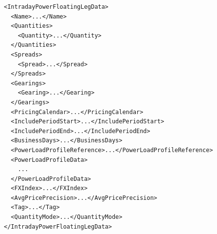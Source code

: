 \begin{listing}[h!]
\begin{verbatim}
<IntradayPowerFloatingLegData>
  <Name>...</Name>
  <Quantities>
    <Quantity>...</Quantity>
  </Quantities>
  <Spreads>
    <Spread>...</Spread>
  </Spreads>
  <Gearings>
    <Gearing>...</Gearing>
  </Gearings>
  <PricingCalendar>...</PricingCalendar>
  <IncludePeriodStart>...</IncludePeriodStart>
  <IncludePeriodEnd>...</IncludePeriodEnd>
  <BusinessDays>...</BusinessDays>
  <PowerLoadProfileReference>...</PowerLoadProfileReference>
  <PowerLoadProfileData>
    ...
  </PowerLoadProfileData>
  <FXIndex>...</FXIndex>
  <AvgPricePrecision>...</AvgPricePrecision>
  <Tag>...</Tag>
  <QuantityMode>...</QuantityMode>
</IntradayPowerFloatingLegData>
\end{verbatim}
\caption{Intraday power floating leg data outline.}
\label{lst:intraday_power_floating_leg_data}
\end{listing}
